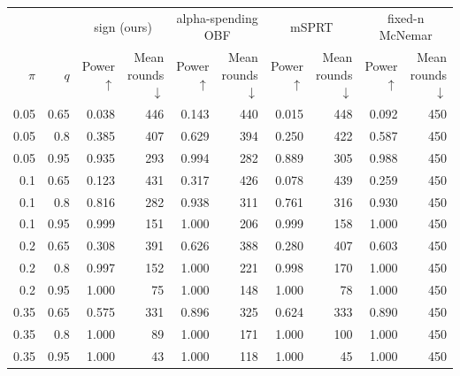 \begin{tabular}{rrrrrrrrrr}
\toprule
 & & \multicolumn{2}{c}{sign (ours)} & \multicolumn{2}{c}{alpha-spending OBF} & \multicolumn{2}{c}{mSPRT} & \multicolumn{2}{c}{fixed-n McNemar} \\
$\pi$ & $q$ & Power $\uparrow$ & Mean rounds $\downarrow$ & Power $\uparrow$ & Mean rounds $\downarrow$ & Power $\uparrow$ & Mean rounds $\downarrow$ & Power $\uparrow$ & Mean rounds $\downarrow$ \\
\midrule
0.05 & 0.65 & 0.038 & 446 & 0.143 & 440 & 0.015 & 448 & 0.092 & 450 \\
0.05 & 0.8 & 0.385 & 407 & 0.629 & 394 & 0.250 & 422 & 0.587 & 450 \\
0.05 & 0.95 & 0.935 & 293 & 0.994 & 282 & 0.889 & 305 & 0.988 & 450 \\
0.1 & 0.65 & 0.123 & 431 & 0.317 & 426 & 0.078 & 439 & 0.259 & 450 \\
0.1 & 0.8 & 0.816 & 282 & 0.938 & 311 & 0.761 & 316 & 0.930 & 450 \\
0.1 & 0.95 & 0.999 & 151 & 1.000 & 206 & 0.999 & 158 & 1.000 & 450 \\
0.2 & 0.65 & 0.308 & 391 & 0.626 & 388 & 0.280 & 407 & 0.603 & 450 \\
0.2 & 0.8 & 0.997 & 152 & 1.000 & 221 & 0.998 & 170 & 1.000 & 450 \\
0.2 & 0.95 & 1.000 & 75 & 1.000 & 148 & 1.000 & 78 & 1.000 & 450 \\
0.35 & 0.65 & 0.575 & 331 & 0.896 & 325 & 0.624 & 333 & 0.890 & 450 \\
0.35 & 0.8 & 1.000 & 89 & 1.000 & 171 & 1.000 & 100 & 1.000 & 450 \\
0.35 & 0.95 & 1.000 & 43 & 1.000 & 118 & 1.000 & 45 & 1.000 & 450 \\
\bottomrule
\end{tabular}
